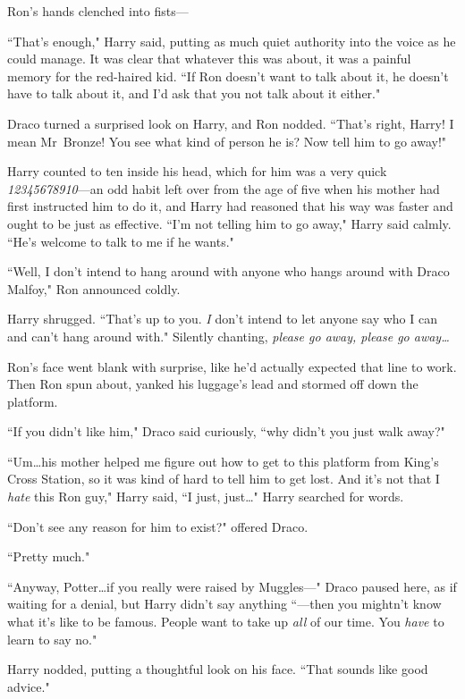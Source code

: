 Ron's hands clenched into fists—

``That's enough," Harry said, putting as much quiet authority into the voice as he could manage. It was clear that whatever this was about, it was a painful memory for the red-haired kid. ``If Ron doesn't want to talk about it, he doesn't have to talk about it, and I'd ask that you not talk about it either."

Draco turned a surprised look on Harry, and Ron nodded. ``That's right, Harry! I mean Mr~Bronze! You see what kind of person he is? Now tell him to go away!"

Harry counted to ten inside his head, which for him was a very quick \emph{12345678910}—an odd habit left over from the age of five when his mother had first instructed him to do it, and Harry had reasoned that his way was faster and ought to be just as effective. ``I'm not telling him to go away," Harry said calmly. ``He's welcome to talk to me if he wants."

``Well, I don't intend to hang around with anyone who hangs around with Draco Malfoy," Ron announced coldly.

Harry shrugged. ``That's up to you. \emph{I} don't intend to let anyone say who I can and can't hang around with." Silently chanting, \emph{please go away, please go away…}

Ron's face went blank with surprise, like he'd actually expected that line to work. Then Ron spun about, yanked his luggage's lead and stormed off down the platform.

``If you didn't like him," Draco said curiously, ``why didn't you just walk away?"

``Um…his mother helped me figure out how to get to this platform from King's Cross Station, so it was kind of hard to tell him to get lost. And it's not that I \emph{hate} this Ron guy," Harry said, ``I just, just…" Harry searched for words.

``Don't see any reason for him to exist?" offered Draco.

``Pretty much."

``Anyway, Potter…if you really were raised by Muggles—" Draco paused here, as if waiting for a denial, but Harry didn't say anything ``—then you mightn't know what it's like to be famous. People want to take up \emph{all} of our time. You \emph{have} to learn to say no."

Harry nodded, putting a thoughtful look on his face. ``That sounds like good advice."

